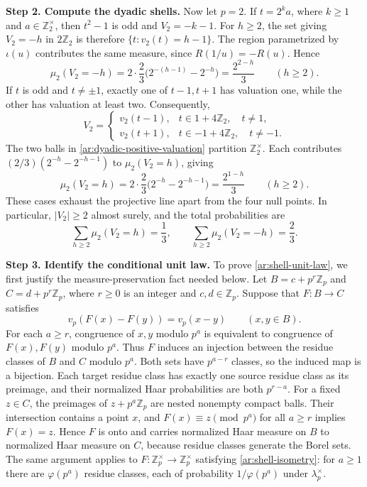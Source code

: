 \documentclass[twoside]{aomart}
\makeatletter
\theoremstyle{paperplain}
\theoremstyle{paperdefinition}
\renewenvironment{proof}[1][\proofname]{\par\pushQED{\qed}%
  \normalfont\topsep6\p@\@plus3\p@\relax\trivlist
  \item[\hskip\labelsep\itshape #1\@addpunct{.}]\ignorespaces
}{\popQED\endtrivlist\@endpefalse}
\newcommand{\Z}{\mathbb Z}
\numberwithin{equation}{section}
\makeatother
\begin{document}
\begin{proof}
\par
\medskip
\noindent\textbf{Step 2. Compute the dyadic shells.}
Now let $p=2$. If $t=2^k a$, where $k\ge1$ and
$a\in\Z_2^\times$, then $t^2-1$ is odd and
$V_2=-k-1$. For $h\ge2$, the set giving $V_2=-h$
in $2\Z_2$ is therefore $\{t:v_2(t)=h-1\}$.
The region parametrized by $\iota(u)$ contributes
the same measure, since $R(1/u)=-R(u)$. Hence
\begin{equation*}
 \mu_2(V_2=-h)
  =2\cdot\frac23\bigl(2^{-(h-1)}-2^{-h}\bigr)
  =\frac{2^{2-h}}3\qquad(h\ge2).
\end{equation*}
If $t$ is odd and $t\ne\pm1$, exactly one of $t-1,t+1$
has valuation one, while the other has valuation at least
two. Consequently,
\begin{equation}
 V_2=
 \begin{cases}
  v_2(t-1),&t\in1+4\Z_2,\quad t\ne1,\\
  v_2(t+1),&t\in-1+4\Z_2,\quad t\ne-1.
 \end{cases}
 \label{ar:dyadic-positive-valuation}
\end{equation}
The two balls in \eqref{ar:dyadic-positive-valuation}
partition $\Z_2^\times$. Each contributes
$(2/3)(2^{-h}-2^{-h-1})$ to $\mu_2(V_2=h)$, giving
\begin{equation*}
 \mu_2(V_2=h)
  =2\cdot\frac23\bigl(2^{-h}-2^{-h-1}\bigr)
  =\frac{2^{1-h}}3\qquad(h\ge2).
\end{equation*}
These cases exhaust the projective line apart from the
four null points. In particular, $|V_2|\ge2$ almost surely,
and the total probabilities are
\begin{equation*}
 \sum_{h\ge2}\mu_2(V_2=h)=\frac13,\qquad
 \sum_{h\ge2}\mu_2(V_2=-h)=\frac23.
\end{equation*}

\par
\medskip
\noindent\textbf{Step 3. Identify the conditional unit law.}
To prove \eqref{ar:shell-unit-law}, we first justify the
measure-preservation fact needed below. Let
$B=c+p^r\Z_p$ and $C=d+p^r\Z_p$, where $r\ge0$
is an integer and $c,d\in\Z_p$. Suppose that $F:B\to C$
satisfies
\begin{equation}
 v_p(F(x)-F(y))=v_p(x-y)\qquad(x,y\in B).
 \label{ar:shell-isometry}
\end{equation}
For each $a\ge r$, congruence of $x,y$ modulo $p^a$
is equivalent to congruence of $F(x),F(y)$ modulo $p^a$.
Thus $F$ induces an injection between the residue classes
of $B$ and $C$ modulo $p^a$. Both sets have $p^{a-r}$
classes, so the induced map is a bijection. Each target
residue class has exactly one source residue class as its
preimage, and their normalized Haar probabilities are
both $p^{r-a}$. For a fixed $z\in C$, the preimages of
$z+p^a\Z_p$ are nested nonempty compact balls. Their
intersection contains a point $x$, and
$F(x)\equiv z\pmod{p^a}$ for all $a\ge r$ implies
$F(x)=z$. Hence $F$ is onto and carries normalized Haar
measure on $B$ to normalized Haar measure on $C$,
because residue classes generate the Borel sets.
The same argument applies to $F:\Z_p^\times\to\Z_p^\times$
satisfying \eqref{ar:shell-isometry}: for $a\ge1$ there
are $\varphi(p^a)$ residue classes, each of probability
$1/\varphi(p^a)$ under $\lambda_p^\times$.


\end{proof}
\end{document}
